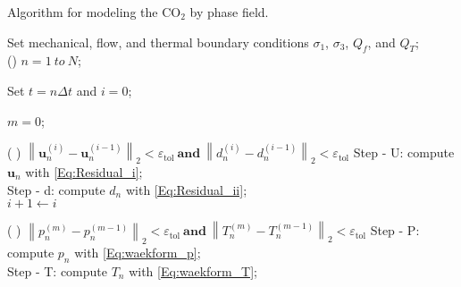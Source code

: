 \LinesNumbered
\begin{algorithm}[htbp]
	\caption{Algorithm for modeling the CO$_2$ by phase field.} \label{Alg:Co_2_fracking}
	
	
	Set mechanical, flow, and thermal boundary conditions $\sigma_1$, $\sigma_3$, $Q_f$, and $Q_T$;\\
	
	\For()
	{ {$n= 1 ~ to~ N$};  }{Set  $t=n\Delta t$ and $i=0$; 
		
				$m=0$; 
				
				
				
				
				{\Repeat( ){   $\left\| \bm{u}_n^{\left( i\right) }-\bm{u}_{n}^{\left( i-1\right) } \right\|_{2}  <\varepsilon_{\text{tol}} ~\textbf{and}~ \left\| d_n^{\left( i\right) }-d_{n}^{\left( i-1\right) } \right\|_{2}  <\varepsilon_{\text{tol}}$  }
					{
						Step - U: compute $\bm{u}_{n}$ with \eqref{Eq:Residual_i};\label{line:compute_u}\\
						Step - d: compute $d_n$ with \eqref{Eq:Residual_ii}; \\
						
						
						$i+1 \leftarrow i$
					}
				}
				
				{\Repeat( ){   $\left\| p_n^{\left( m\right) }-p_{n}^{\left( m-1\right) } \right\|_{2}  <\varepsilon_{\text{tol}} ~\textbf{and}~ \left\| T_n^{\left( m\right) }-T_{n}^{\left( m-1\right) } \right\|_{2}  <\varepsilon_{\text{tol}}$  }
				{
					Step - P: compute $p_n$ with \eqref{Eq:waekform_p};\\
				
					
					Step - T: compute $T_n$ with \eqref{Eq:waekform_T};\\
					
}}}
\end{algorithm}
